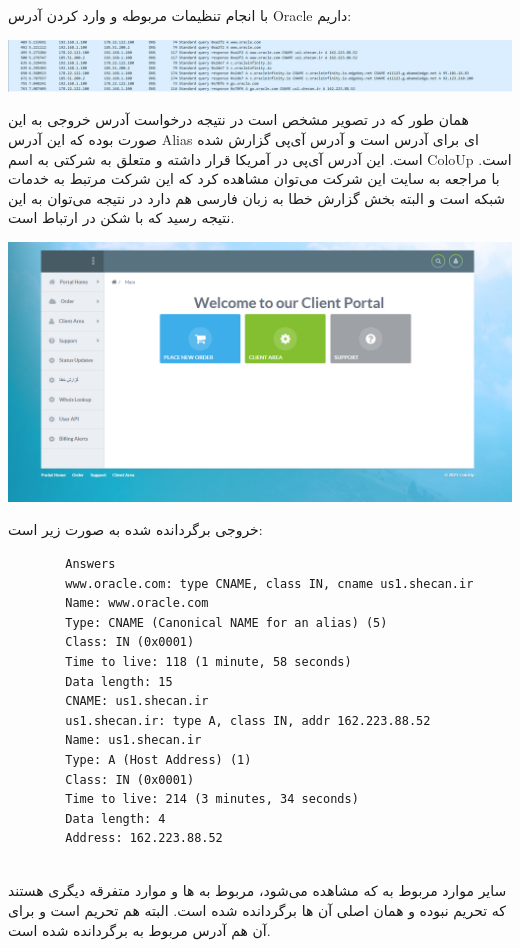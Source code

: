 \documentclass[12pt]{article}
\begin{document}
\begin{enumerate}
با انجام تنظیمات مربوطه و وارد کردن آدرس Oracle داریم:

			\begin{center}
		\includegraphics[width = 1.0 \textwidth]{images/3.png}
	\end{center}
	
	همان طور که در تصویر مشخص است در نتیجه درخواست آدرس  خروجی به این صورت بوده که این آدرس Alias ای برای آدرس  است و آدرس آی‌پی  گزارش شده است. این آدرس آی‌پی در آمریکا قرار داشته و متعلق به شرکتی به اسم ColoUp است. با مراجعه به سایت این شرکت می‌توان مشاهده کرد که این شرکت مرتبط به خدمات شبکه است و البته بخش گزارش خطا به زبان فارسی هم دارد در نتیجه می‌توان به این نتیجه رسید که با شکن در ارتباط است.
			\begin{center}
		\includegraphics[width = 0.5 \textwidth]{images/4.png}
	\end{center}

خروجی برگردانده شده به صورت زیر است:

\begin{latin}
	\begin{verbatim}
		Answers
		www.oracle.com: type CNAME, class IN, cname us1.shecan.ir
		Name: www.oracle.com
		Type: CNAME (Canonical NAME for an alias) (5)
		Class: IN (0x0001)
		Time to live: 118 (1 minute, 58 seconds)
		Data length: 15
		CNAME: us1.shecan.ir
		us1.shecan.ir: type A, class IN, addr 162.223.88.52
		Name: us1.shecan.ir
		Type: A (Host Address) (1)
		Class: IN (0x0001)
		Time to live: 214 (3 minutes, 34 seconds)
		Data length: 4
		Address: 162.223.88.52
		
	\end{verbatim}
	\end{latin}

سایر موارد مربوط به  که مشاهده می‌شود، مربوط به  ها و موارد متفرقه دیگری هستند که تحریم نبوده و همان  اصلی آن ها برگردانده شده است. البته  هم تحریم است و برای آن هم آدرس مربوط به  برگردانده شده است.


\end{enumerate}
\end{document}
